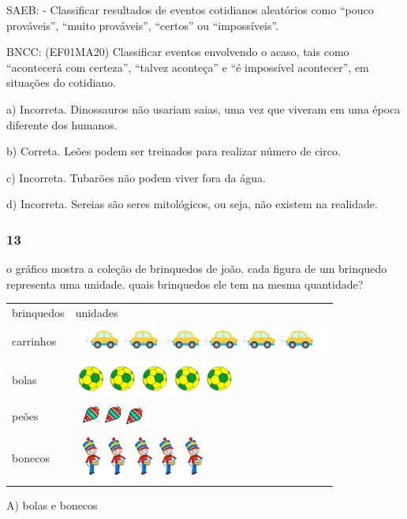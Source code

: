 SAEB: - Classificar resultados de eventos cotidianos aleatórios como
``pouco prováveis'', ``muito prováveis'', ``certos'' ou ``impossíveis''.

BNCC: (EF01MA20) Classificar eventos envolvendo o acaso, tais como
``acontecerá com certeza'', ``talvez aconteça'' e ``é impossível
acontecer'', em situações do cotidiano.

a) Incorreta. Dinossauros não usariam saias, uma vez que viveram em uma
época diferente dos humanos.

b) Correta. Leões podem ser treinados para realizar número de circo.

c) Incorreta. Tubarões não podem viver fora da água.

d) Incorreta. Sereias são seres mitológicos, ou seja, não existem na
realidade.

\subsubsection{13}\label{section-114}

o gráfico mostra a coleção de brinquedos de joão. cada figura de um
brinquedo representa uma unidade. quais brinquedos ele tem na mesma
quantidade?

\begin{longtable}[]{@{}ll@{}}
\toprule
brinquedos & unidades\tabularnewline
carrinhos &
\includegraphics[width=3.32338in,height=0.38547in]{media/image129.png}\tabularnewline
bolas &
\includegraphics[width=2.12138in,height=0.44045in]{media/image132.png}\tabularnewline
peões &
\includegraphics[width=0.97976in,height=0.30538in]{media/image134.png}\tabularnewline
bonecos &
\includegraphics[width=1.70172in,height=0.60128in]{media/image135.png}\tabularnewline
\bottomrule
\end{longtable}

A) bolas e bonecos

